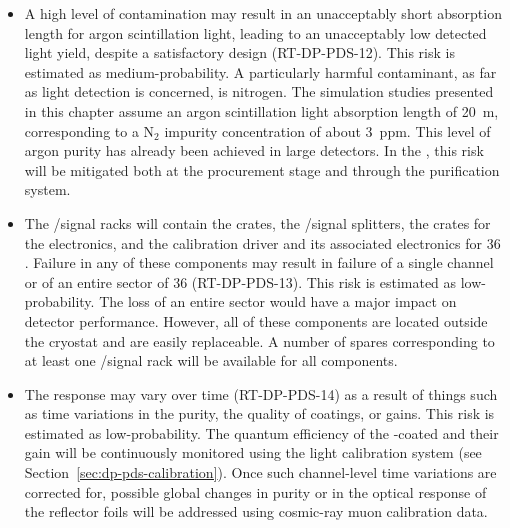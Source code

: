 \begin{itemize}

\item A high level of  contamination may result in an unacceptably short absorption length for argon scintillation light, leading to an unacceptably low detected light yield, despite a satisfactory  design (RT-DP-PDS-12). This risk is estimated as medium-probability. A particularly harmful contaminant, as far as light detection is concerned, is nitrogen. The simulation studies presented in this chapter assume an argon scintillation light absorption length of \SI{20}{m}, corresponding to a N$_2$ impurity concentration of about \SI{3}{ppm}. %
This level of argon purity has already been achieved in large  detectors. In the , this risk will be mitigated both at the  procurement stage %
and through the purification system.

\item The /signal racks will contain the  crates, the /signal splitters, the  crates for the  electronics, and the calibration  driver and %
its associated electronics for \num{36} . Failure in %
any of these components may result in failure of a single  channel or of an entire sector of \num{36}  (RT-DP-PDS-13). This risk is estimated as low-probability. The loss of an entire  sector would have a major impact on detector performance. However, all of these components are located outside the cryostat and are easily replaceable. A number of spares corresponding to at least one /signal rack will be available for all components.

\item The  response may vary over time (RT-DP-PDS-14) as a result of things %
such as time variations in the  purity, the quality of  coatings, or   gains. This risk is estimated as low-probability. The quantum efficiency of the -coated  and their gain will be continuously monitored using the light calibration system (see Section~\ref{sec:dp-pds-calibration}). Once such channel-level time variations are corrected for, possible global changes in  purity or in the optical response of the  reflector foils will be addressed using cosmic-ray muon calibration data. 


\end{itemize}
